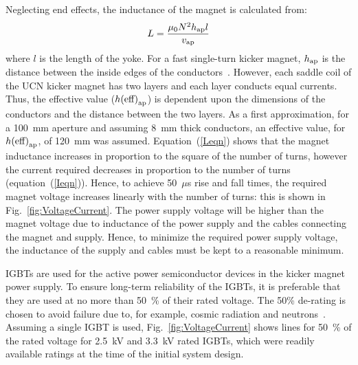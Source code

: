 \documentclass[aps,prab,twocolumn,superscriptaddress]{revtex4-1}
\begin{document}
Neglecting end effects,  the inductance of the magnet is calculated from: 
\begin{equation}\label{Leqn}
L = \frac{\mu_{\rm{0}} N^2 h_{\rm{ap}} l}{v_{\rm{ap}}}
\end{equation}
where $l$ is the length of the yoke. For a fast single-turn kicker magnet,  $h_{\rm ap}$ is the distance between the inside edges of the conductors~\cite{Barnes:CAS2017}. However, each saddle coil of the UCN kicker magnet has two layers and each layer conducts equal currents. Thus, the effective value ($h{\rm(eff)}_{\rm ap}$) is dependent upon the dimensions of the conductors and the distance between the two layers. As a first approximation, for a 100~mm aperture and assuming 8~mm thick conductors, an effective value, for $h{\rm(eff)}_{\rm ap}$, of 120~mm was assumed. Equation~(\ref{Leqn}) shows that the magnet inductance increases in proportion to the square of the number of turns, however the current required decreases in proportion to the number of turns (equation~(\ref{Ieqn})). Hence, to achieve 50~$\mu$s rise and fall times, the required magnet voltage increases linearly with the number of turns: this is shown in Fig.~\ref{fig:VoltageCurrent}. The power supply voltage will be higher than the magnet voltage due to inductance of the power supply and the cables connecting the magnet and supply. Hence, to minimize the required power supply voltage, the inductance of the supply and cables must be kept to a reasonable minimum. 

IGBTs are used for the active power semiconductor devices in the kicker magnet power supply. To ensure long-term  reliability of the IGBTs, it is preferable that they are used at no more than 50~\% of their rated voltage. The 50\% de-rating is chosen to avoid failure due to, for example, cosmic radiation and neutrons~\cite{Shoji}. Assuming a single IGBT is used, Fig.~\ref{fig:VoltageCurrent} shows lines for 50~\% of the rated voltage for 2.5~kV and 3.3~kV rated IGBTs, which were readily available ratings at the time of the initial system design. 
\end{document}
